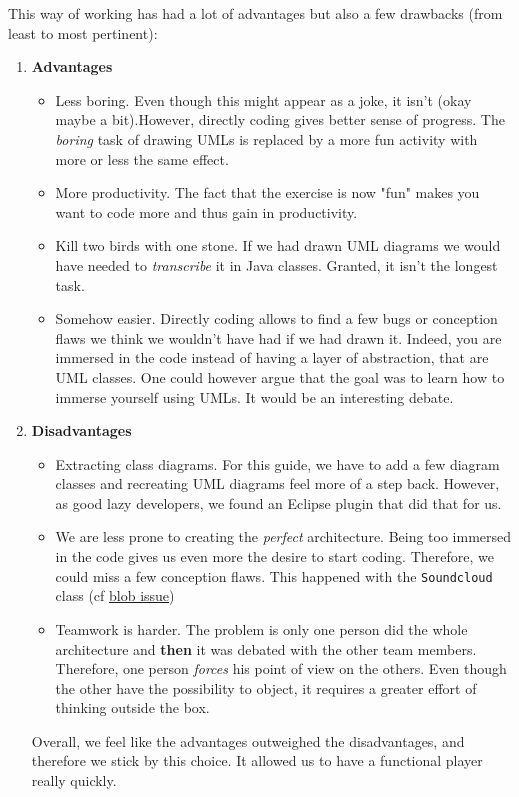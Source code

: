 \documentclass{report}
\begin{document}
This way of working has had a lot of advantages but also a few drawbacks (from least to most pertinent): 
\begin{enumerate}
\item \textbf{Advantages}
\begin{itemize}
\item Less boring. Even though this might appear as a joke, it isn't \tiny{(okay maybe a bit)}.\normalsize  However, directly coding gives better sense of progress. The \textit{boring} task of drawing UMLs is replaced by a more fun activity with more or less the same effect. 
\item More productivity. The fact that the exercise is now "fun" makes you want to code more and thus gain in productivity.
\item Kill two birds with one stone. If we had drawn UML diagrams we would have needed to \textit{transcribe} it in Java classes. Granted, it isn't the longest task.
\item Somehow easier. Directly coding allows to find a few bugs or conception flaws we think we wouldn't have had if we had drawn it. Indeed, you are immersed in the code instead of having a layer of abstraction, that are UML classes. One could however argue that the goal was to learn how to immerse yourself using UMLs. It would be an interesting debate.
\end{itemize}
\item \textbf{Disadvantages}
\begin{itemize}
\item Extracting class diagrams. For this guide, we have to add a few diagram classes and recreating UML diagrams feel more of a step back. However, as good lazy developers, we found an Eclipse plugin that did that for us.
\item We are less prone to creating the \textit{perfect} architecture. Being too immersed in the code gives us even more the desire to start coding. Therefore, we could miss a few conception flaws. This happened with the \texttt{Soundcloud} class (cf \hyperlink{blob}{blob issue})
\item Teamwork is harder. The problem is only one person did the whole architecture and \textbf{then} it was debated with the other team members. Therefore, one person \textit{forces} his point of view on the others. Even though the other have the possibility to object, it requires a greater effort of thinking outside the box.
\end{itemize}

Overall, we feel like the advantages outweighed the disadvantages, and therefore we stick by this choice. It allowed us to have a functional player really quickly.

\end{enumerate}
\end{document}
